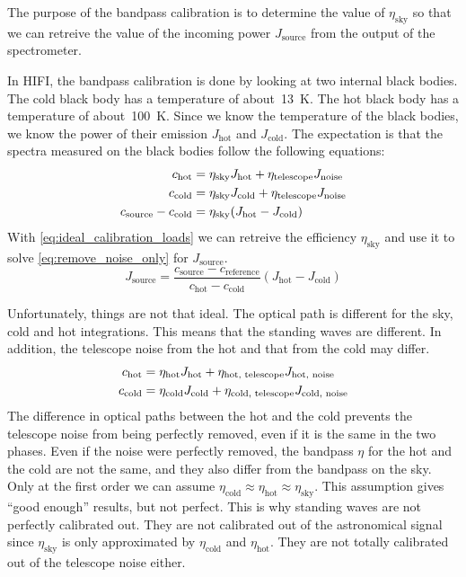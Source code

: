 The purpose of the bandpass calibration is to determine the value of $\eta_\text{sky}$ so that we can retreive the value of the incoming power $J_\text{source}$ from the output of the spectrometer.

In HIFI, the bandpass calibration is done by looking at two internal black bodies.
The cold black body has a temperature of about~\SI{13}{\kelvin}.
The hot black body has a temperature of about~\SI{100}{\kelvin}.
Since we know the temperature of the black bodies, we know the power of their emission $J_\text{hot}$ and $J_\text{cold}$.
The expectation is that the spectra measured on the black bodies follow the following equations:
\begin{align}
    c_\text{hot}  &= \eta_\text{sky} J_\text{hot} + \eta_\text{telescope} J_\text{noise} \notag
    \\
    c_\text{cold} &= \eta_\text{sky} J_\text{cold} + \eta_\text{telescope} J_\text{noise} \notag
    \\
    c_\text{source} - c_\text{cold} &= \eta_\text{sky} (J_\text{hot} - J_\text{cold}) \label{eq:ideal_calibration_loads}
\end{align}
With \cref{eq:ideal_calibration_loads} we can retreive the efficiency $\eta_\text{sky}$ and use it to solve \cref{eq:remove_noise_only} for $J_\text{source}$.
\begin{equation}
    J_\text{source} =
    \frac{
        c_\text{source} - c_\text{reference}
    }{
        c_\text{hot} - c_\text{cold}
    }
    (J_\text{hot} - J_\text{cold})
    \label{eq:ideal_calibration_solution}
\end{equation}

Unfortunately, things are not that ideal.
The optical path is different for the sky, cold and hot integrations.
This means that the standing waves are different.
In addition, the telescope noise from the hot and that from the cold may differ.
\begin{align}
    c_\text{hot}  &= \eta_\text{hot} J_\text{hot} + \eta_\text{hot, telescope} J_\text{hot, noise} \notag
    \\
    c_\text{cold} &= \eta_\text{cold} J_\text{cold} + \eta_\text{cold, telescope} J_\text{cold, noise} \notag \label{eq:real_calibration_loads}
\end{align}
The difference in optical paths between the hot and the cold prevents the telescope noise from being perfectly removed, even if it is the same in the two phases.
Even if the noise were perfectly removed, the bandpass $\eta$ for the hot and the cold are not the same, and they also differ from the bandpass on the sky.
Only at the first order we can assume $\eta_\text{cold} \approx \eta_\text{hot} \approx \eta_\text{sky}$.
This assumption gives ``good enough'' results, but not perfect.
This is why standing waves are not perfectly calibrated out.
They are not calibrated out of the astronomical signal since $\eta_\text{sky}$ is only approximated by $\eta_\text{cold}$ and $\eta_\text{hot}$.
They are not totally calibrated out of the telescope noise either.

